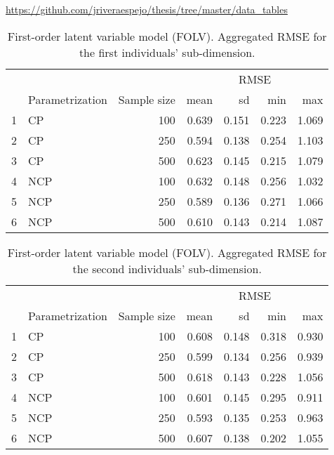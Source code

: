 \noindent \url{https://github.com/jriveraespejo/thesis/tree/master/data_tables} \\
%
\begin{table}[H]
	\centering
	\begin{tabular}{rlrrrrr}
		\hline
		\multicolumn{3}{c}{ } & \multicolumn{4}{c}{ RMSE } \\ 
		\cmidrule(rl){4-7}
		& Parametrization & Sample size & mean & sd & min & max \\  
		\hline\hline
		1 & CP &  100 & 0.639 & 0.151 & 0.223 & 1.069 \\ 
		2 & CP &  250 & 0.594 & 0.138 & 0.254 & 1.103 \\ 
		3 & CP &  500 & 0.623 & 0.145 & 0.215 & 1.079 \\ 
		\hline
		4 & NCP &  100 & 0.632 & 0.148 & 0.256 & 1.032 \\  
		5 & NCP &  250 & 0.589 & 0.136 & 0.271 & 1.066 \\ 
		6 & NCP &  500 & 0.610 & 0.143 & 0.214 & 1.087 \\  
		\hline
	\end{tabular}
	\caption[First-order latent variable model (FOLV). Aggregated RMSE for the first individuals' sub-dimension.]%
	{First-order latent variable model (FOLV). Aggregated RMSE for the first individuals' sub-dimension.}
	\label{tab:FOLV_RMSE_theta1}
\end{table}
%
\begin{table}[H]
	\centering
	\begin{tabular}{rlrrrrr}
		\hline
		\multicolumn{3}{c}{ } & \multicolumn{4}{c}{ RMSE } \\ 
		\cmidrule(rl){4-7}
		& Parametrization & Sample size & mean & sd & min & max \\  
		\hline\hline
		1 & CP &  100 & 0.608 & 0.148 & 0.318 & 0.930 \\ 
		2 & CP &  250 & 0.599 & 0.134 & 0.256 & 0.939 \\  
		3 & CP &  500 & 0.618 & 0.143 & 0.228 & 1.056 \\  
		\hline
		4 & NCP &  100 & 0.601 & 0.145 & 0.295 & 0.911 \\ 
		5 & NCP &  250 & 0.593 & 0.135 & 0.253 & 0.963 \\ 
		6 & NCP &  500 & 0.607 & 0.138 & 0.202 & 1.055 \\
		\hline
	\end{tabular}
	\caption[First-order latent variable model (FOLV). Aggregated RMSE for the second individuals' sub-dimension.]%
	{First-order latent variable model (FOLV). Aggregated RMSE for the second individuals' sub-dimension.}
	\label{tab:FOLV_RMSE_theta2}
\end{table}
